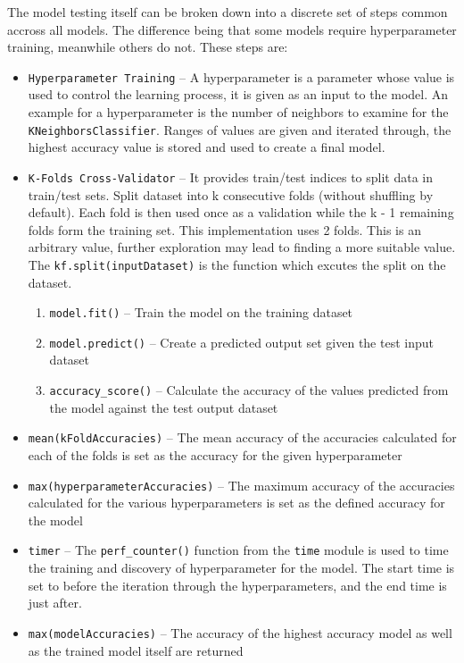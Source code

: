 The model testing itself can be broken down into a discrete set of steps common accross all models. The difference being that some models require hyperparameter training, meanwhile others do not. These steps are:
\begin{itemize}
    \item \texttt{Hyperparameter Training} -- A hyperparameter is a parameter whose value is used to control the learning process, it is given as an input to the model. An example for a hyperparameter is the number of neighbors to examine for the \verb|KNeighborsClassifier|. Ranges of values are given and iterated through, the highest accuracy value is stored and used to create a final model.
    \item \texttt{K-Folds Cross-Validator} -- It provides train/test indices to split data in train/test sets. Split dataset into k consecutive folds (without shuffling by default). Each fold is then used once as a validation while the k - 1 remaining folds form the training set. This implementation uses 2 folds. This is an arbitrary value, further exploration may lead to finding a more suitable value. The \verb|kf.split(inputDataset)| is the function which excutes the split on the dataset.
    \begin{enumerate}
        \item \texttt{model.fit()} -- Train the model on the training dataset
        \item \texttt{model.predict()} -- Create a predicted output set given the test input dataset
        \item \texttt{accuracy\_score()} -- Calculate the accuracy of the values predicted from the model against the test output dataset
    \end{enumerate}
    \item \texttt{mean(kFoldAccuracies)} -- The mean accuracy of the accuracies calculated for each of the folds is set as the accuracy for the given hyperparameter
    \item \texttt{max(hyperparameterAccuracies)} -- The maximum accuracy of the accuracies calculated for the various hyperparameters is set as the defined accuracy for the model
    \item \texttt{timer} -- The \verb|perf_counter()| function from the \verb|time| module is used to time the training and discovery of hyperparameter for the model. The start time is set to before the iteration through the hyperparameters, and the end time is just after.
    \item \texttt{max(modelAccuracies)} -- The accuracy of the highest accuracy model as well as the trained model itself are returned
\end{itemize}
